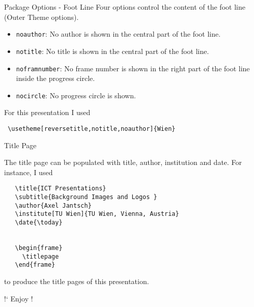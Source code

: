 \begin{frame}[fragile]{Package Options - Foot Line}
   Four options control the content of the foot line (Outer Theme options).
  
\begin{itemize}
\item \texttt{noauthor}: No author is shown in the central part of the
  foot line.
\item \texttt{notitle}: No title is shown in the central part of the
  foot line.
\item \texttt{noframnumber}: No frame number is shown in the right part
  of the foot line inside the progress circle.
\item \texttt{nocircle}: No progress circle is shown.
\end{itemize}

For this presentation I used

\verb| \usetheme[reversetitle,notitle,noauthor]{Wien} |

\end{frame}

\begin{frame}[fragile]{Title Page}

  \begin{block}{}

    The title page can be populated with title, author, institution
    and date. For instance, I used

    \vspace{3ex}

    \hspace{1em}
    \begin{minipage}{0.9\textwidth}
\begin{verbatim}
   \title{ICT Presentations}
   \subtitle{Background Images and Logos }
   \author{Axel Jantsch}
   \institute[TU Wien]{TU Wien, Vienna, Austria}
   \date{\today}

   
   \begin{frame}
     \titlepage
   \end{frame}\end{verbatim}
    \end{minipage}

    \vspace{3ex} to produce the title pages of this presentation.
  \end{block}
\end{frame}


\begin{frame}{}

  \centering\Huge
  !` Enjoy !
\end{frame}

